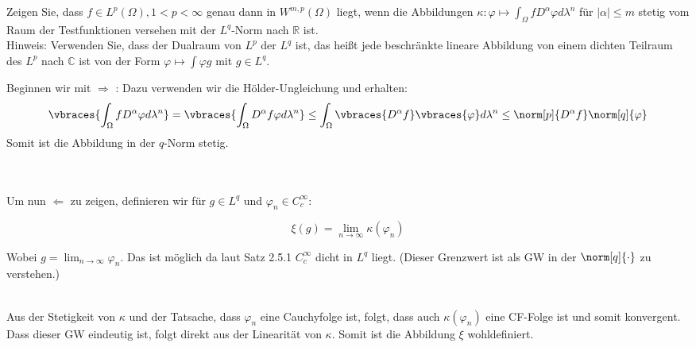 \begin{exercise}

Zeigen Sie, dass $f \in L^p(\Omega), 1 < p < \infty$ genau dann in $W^{m,p}(\Omega)$ liegt, wenn die Abbildungen $\kappa: \varphi \mapsto \int_{\Omega}fD^{\alpha}\varphi d\lambda^n$ für $|\alpha| \leq m$ stetig vom Raum der Testfunktionen versehen mit der $L^q$-Norm nach $\mathbb{R}$ ist. \\

Hinweis: Verwenden Sie, dass der Dualraum von $L^p$ der $L^q$ ist, das heißt jede beschränkte lineare Abbildung von einem dichten Teilraum des $L^p$ nach $\mathbb{C}$ ist von der Form $\varphi \mapsto \int \varphi g$ mit $g \in L^q$.

\end{exercise}

\begin{solution}

Beginnen wir mit $\Rightarrow$ : Dazu verwenden wir die Hölder-Ungleichung
und erhalten:
\begin{equation*}
  \vbraces{\int_{\Omega}fD^{\alpha}\varphi d\lambda^n} =
  \vbraces{\int_{\Omega}D^{\alpha}f\varphi d\lambda^n} \leq
  \int_{\Omega}\vbraces{D^{\alpha}f}\vbraces{\varphi}d\lambda^n \leq
  \norm[p]{D^{\alpha}f}\norm[q]{\varphi}
\end{equation*}
Somit ist die Abbildung in der $q$-Norm stetig.

\\ \\

Um nun $\Leftarrow$ zu zeigen, definieren wir für $g\in L^q$ und
$\varphi_n \in C^{\infty}_c$:

\begin{equation*}
  \xi(g)=\lim_{n\to\infty}\kappa(\varphi_n)
\end{equation*}

Wobei $g =\lim_{n\to\infty}\varphi_n$. Das ist möglich da laut Satz 2.5.1
$C^{\infty}_c$ dicht in $L^q$ liegt. (Dieser Grenzwert ist als GW in der
$\norm[q]{\cdot}$ zu verstehen.)

\\

Aus der Stetigkeit von $\kappa$ und der Tatsache, dass $\varphi_n$ eine
Cauchyfolge ist, folgt, dass auch $\kappa(\varphi_n)$ eine CF-Folge ist und somit
konvergent. Dass dieser GW eindeutig ist, folgt direkt aus der Linearität von
$\kappa$. Somit ist die Abbildung $\xi$ wohldefiniert.

\\


\end{solution}
